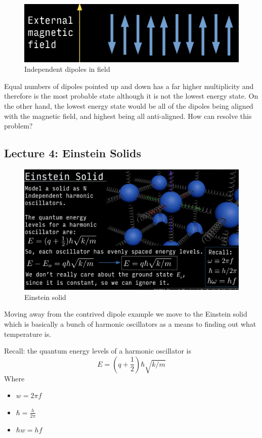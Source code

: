 \documentclass[10pt]{article}
\begin{document}
\begin{figure}[H]
	\centering
	\includegraphics[width=0.8\linewidth]{img/294_dipole_in_field.png}
	\caption{Independent dipoles in field}
	\label{fig:294:dipole_in_field_contrived}
\end{figure}


Equal numbers of dipoles pointed up and down has a far higher multiplicity and therefore is the most probable state although it is not the lowest energy state. 
On the other hand, the lowest energy state would be all of the dipoles being aligned with the magnetic field, and highest being all anti-aligned.
How can resolve this problem?



\subsection{Lecture 4: Einstein Solids}

\begin{figure}[H]
	\centering
	\includegraphics[width=0.8\linewidth]{img/image_2022-03-07-12-15-24.png}
	\caption{Einstein solid}
	\label{fig:294:einstein_solid}
\end{figure}

Moving away from the contrived dipole example we move to the Einstein solid which is basically a bunch of harmonic oscillators as a means to finding out what temperature is.

\begin{blockquote}
	Recall: the quantum energy levels of a harmonic oscillator is
	 \begin{equation}
	 	E = (q+\frac{1}{2} ) \hbar \sqrt{k/m} 
	 	\label{eq:294:quantum_energy_level_harmonic_osc}
	 \end{equation}
	 Where
	 \begin{itemize}
	 	\item $ w = 2\pi f $ 
		\item $ \hbar = \frac{h}{2\pi} $ 
		\item $ \hbar w = h f $ 
	 \end{itemize}
\end{blockquote}
\end{document}
